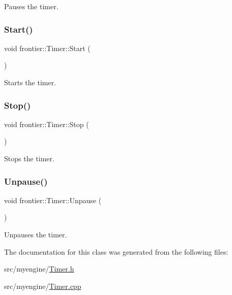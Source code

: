 Pauses the timer. 

\mbox{\label{classfrontier_1_1_timer_a26c5d9aeddfcb91bea46d7f14b35e923}} 
\subsubsection{\texorpdfstring{Start()}{Start()}}
{\footnotesize\ttfamily void frontier\+::\+Timer\+::\+Start (\begin{DoxyParamCaption}{ }\end{DoxyParamCaption})}



Starts the timer. 

\mbox{\label{classfrontier_1_1_timer_a878f61e350e7bb28350964f105192533}} 
\subsubsection{\texorpdfstring{Stop()}{Stop()}}
{\footnotesize\ttfamily void frontier\+::\+Timer\+::\+Stop (\begin{DoxyParamCaption}{ }\end{DoxyParamCaption})}



Stops the timer. 

\mbox{\label{classfrontier_1_1_timer_a18d0b8d623b50b64fb0893cd9dec56ce}} 
\subsubsection{\texorpdfstring{Unpause()}{Unpause()}}
{\footnotesize\ttfamily void frontier\+::\+Timer\+::\+Unpause (\begin{DoxyParamCaption}{ }\end{DoxyParamCaption})}



Unpauses the timer. 



The documentation for this class was generated from the following files\+:\begin{DoxyCompactItemize}
\item 
src/myengine/\hyperlink{_timer_8h}{Timer.\+h}\item 
src/myengine/\hyperlink{_timer_8cpp}{Timer.\+cpp}\end{DoxyCompactItemize}
